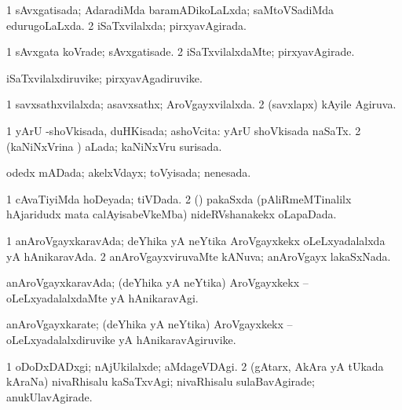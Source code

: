 \bentry
{} 
\gl{\gu}
\expl{}
\bmng
\bnum
\num{1} sAvxgatisada; AdaradiMda baramADikoLaLxda; saMtoVSadiMda edurugoLaLxda. 
\num{2} iSaTxvilalxda; pirxyavAgirada. 
\enum
\emng
\eentry

\bentry
{} 
\gl{\kirxvi}
\expl{}
\bmng
\bnum
\num{1} sAvxgata koVrade; sAvxgatisade. 
\num{2} iSaTxvilalxdaMte; pirxyavAgirade. 
\enum
\emng
\eentry

\bentry
{} 
\gl{\nA}
\expl{}
\bmng
iSaTxvilalxdiruvike; pirxyavAgadiruvike. 
\emng
\eentry

\bentry
{} 
\gl{\gu}
\expl{}
\bmng
\bnum
\num{1} savxsathxvilalxda; asavxsathx; AroVgayxvilalxda. 
\num{2} (savxlapx) kAyile Agiruva. 
\enum
\emng
\eentry

\bentry
{} 
\gl{\gu}
\expl{}
\bmng
\bnum
\num{1} yArU -shoVkisada, duHKisada; ashoVcita:  yArU shoVkisada naSaTx. 
\num{2} (kaNiNxVrina \vi) aLada; kaNiNxVru surisada. 
\enum
\emng
\eentry

\bentry
{} 
\gl{\gu}
\expl{}
\bmng
odedx mADada; akelxVdayx; toVyisada; nenesada. 
\emng
\eentry

\bentry
{} 
\gl{\gu}
\expl{}
\bmng
\bnum
\num{1} cAvaTiyiMda hoDeyada; tiVDada. 
\num{2} (\birx) pakaSxda (pAliRmeMTinalilx hAjaridudx mata calAyisabeVkeMba) nideRVshanakekx oLapaDada. 
\enum
\emng
\eentry

\bentry
{} 
\gl{\gu}
\expl{}
\bmng
\bnum
\num{1} anAroVgayxkaravAda; deYhika yA neYtika AroVgayxkekx oLeLxyadalalxda yA hAnikaravAda. 
\num{2} anAroVgayxviruvaMte kANuva; anAroVgayx lakaSxNada. 
\enum
\emng
\eentry

\bentry
{} 
\gl{\kirxvi}
\expl{}
\bmng
anAroVgayxkaravAda; (deYhika yA neYtika) AroVgayxkekx -- oLeLxyadalalxdaMte yA hAnikaravAgi. 
\emng
\eentry

\bentry
{} 
\gl{\nA}
\expl{}
\bmng
anAroVgayxkarate; (deYhika yA neYtika) AroVgayxkekx -- oLeLxyadalalxdiruvike yA hAnikaravAgiruvike. 
\emng
\eentry

\bentry
{} 
\gl{\kirxvi}
\expl{}
\bmng
\bnum
\num{1} oDoDxDADxgi; nAjUkilalxde; aMdageVDAgi. 
\num{2} (gAtarx, AkAra yA tUkada kAraNa) nivaRhisalu kaSaTxvAgi; nivaRhisalu sulaBavAgirade; anukUlavAgirade. 
\enum
\emng
\eentry


